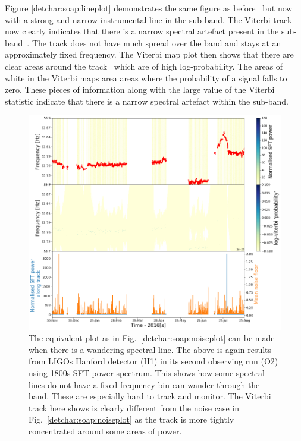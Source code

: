 Figure \ref{detchar:soap:lineplot}
demonstrates the same figure as before~ but now with a strong and narrow
instrumental line in the sub-band.  The Viterbi track now clearly indicates
that there is a narrow spectral artefact present in the
sub-band~. The track
does not have much spread over the band and stays at an approximately fixed
frequency.  The Viterbi map plot then shows that there are clear areas around
the track~ which are of high log-probability. The areas of white in the Viterbi
maps area areas where the probability of a signal falls to zero.  These pieces
of information along with the large value of the Viterbi statistic indicate
that there is a narrow spectral artefact within the sub-band.~ 

%
\begin{figure}[hpt]
	\centering
	\includegraphics[width=\textwidth]{C5_detchar/track_F53_7_53_9_wander.png}
	\caption[Example SOAP output for wandering line.]{The equivalent plot as in Fig.~\ref{detchar:soap:noiseplot} can be made when there is a wandering spectral line. The above is again results from \glspl{LIGO} Hanford detector (H1) in its second observing run (O2) using 1800s \gls{SFT} power spectrum. This shows how some spectral lines do not have a fixed frequency bin can wander through the band. These are especially hard to track and monitor. The Viterbi track here shows is clearly different from the noise case in Fig.~\ref{detchar:soap:noiseplot} as the track is more tightly concentrated around some areas of power. }
	\label{detchar:soap:wanderplot}
\end{figure}
%

